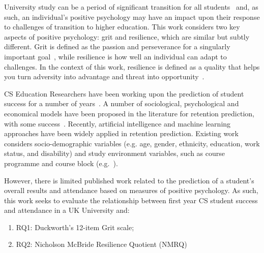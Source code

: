 \documentclass[sigconf]{acmart}
\begin{document}
University study can be a period of significant transition for all students~\cite{Tinto1975} and, as such, an individual's positive psychology may have an impact upon their response to challenges of transition to higher education. This work considers two key aspects of positive psychology: grit and resilience, which are similar but subtly different. Grit is defined as the passion and perseverance for a singularly important goal~\cite{Duckworth2016}, while resilience is how well an individual can adapt to challenges. In the context of this work, resilience is defined as a quality that helps you turn adversity into advantage and threat into opportunity~\cite{Clarke2010}.  

CS Education Researchers have been working upon the prediction of student success for a number of years~\cite{Robins2010}.  A number of sociological, psychological and economical models have been proposed in the literature for retention prediction, with some success~\cite{Seidman2012}. Recently, artificial intelligence and machine learning approaches have been widely applied in retention prediction. Existing work considers socio-demographic variables (e.g. age, gender, ethnicity, education, work status, and disability) and study environment variables, such as course programme and course block (e.g.~\cite{Kovaci2012,Liao:2019:EVD:3287324.3287407}).

 However, there is limited published work related to the prediction of a student's overall results and attendance based on measures of positive psychology. As such, this work seeks to evaluate the relationship between first year CS student success and attendance in a UK University and:
\begin{enumerate}
    \item RQ1: Duckworth's 12-item Grit scale;
    \item RQ2: Nicholson McBride Resilience Quotient (NMRQ)
\end{enumerate}
\end{document}
